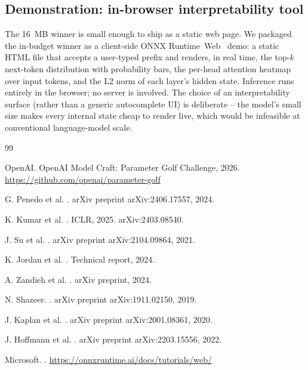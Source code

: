 \documentclass[sigconf,nonacm,natbib=false]{acmart}
\renewcommand{\_}{\discretionary{\char`\_}{}{\char`\_}}
\begin{document}
\subsection{Demonstration: in-browser interpretability tool}

The 16~MB winner is small enough to ship as a static web page. We
packaged the in-budget winner as a client-side ONNX
Runtime~Web~\cite{onnxruntimeweb} demo: a static HTML file that
accepts a user-typed prefix and renders, in real time, the top-$k$
next-token distribution with probability bars, the per-head attention
heatmap over input tokens, and the L2 norm of each layer's hidden
state. Inference runs entirely in the browser; no server is involved.
The choice of an interpretability surface (rather than a generic
autocomplete UI) is deliberate -- the model's small size makes every
internal state cheap to render live, which would be infeasible at
conventional language-model scale.

\begin{thebibliography}{99}

OpenAI.
\newblock OpenAI Model Craft: Parameter Golf Challenge, 2026.
\newblock \url{https://github.com/openai/parameter-golf}

G. Penedo et al.
.
\newblock arXiv preprint arXiv:2406.17557, 2024.

K. Kumar et al.
.
\newblock ICLR, 2025. arXiv:2403.08540.

J. Su et al.
.
\newblock arXiv preprint arXiv:2104.09864, 2021.

K. Jordan et al.
.
\newblock Technical report, 2024.

A. Zandieh et al.
.
\newblock arXiv preprint, 2024.

N. Shazeer.
.
\newblock arXiv preprint arXiv:1911.02150, 2019.

J. Kaplan et al.
.
\newblock arXiv preprint arXiv:2001.08361, 2020.

J. Hoffmann et al.
.
\newblock arXiv preprint arXiv:2203.15556, 2022.

Microsoft.
.
\newblock \url{https://onnxruntime.ai/docs/tutorials/web/}

\end{thebibliography}
\end{document}
